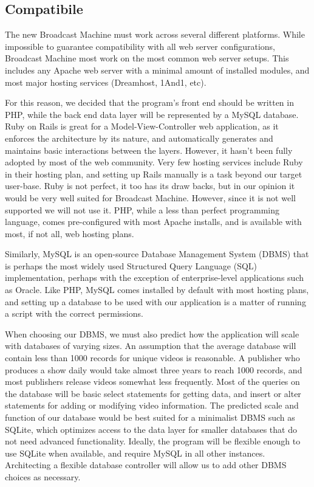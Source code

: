 \documentclass[a4paper,12pt]{report}
\begin{document}
\subsection{Compatibile}
The new Broadcast Machine must work across several different platforms. 
While impossible to guarantee compatibility with all web server configurations, Broadcast Machine most work on the most common web server setups. 
This includes any Apache web server with a minimal amount of installed modules, and most major hosting services (Dreamhost, 1And1, etc). 


For this reason, we decided that the program’s front end should be written in PHP, while the back end data layer will be represented by a MySQL database. 
Ruby on Rails is great for a Model-View-Controller web application, as it enforces the architecture by its nature, and automatically generates and maintains basic interactions between the layers. 
However, it hasn’t been fully adopted by most of the web community.  
Very few hosting services include Ruby in their hosting plan, and setting up Rails manually is a task beyond our target user-base. 
Ruby is not perfect, it too has its draw backs, but in our opinion it would be very well suited for Broadcast Machine. 
However, since it is not well supported we will not use it. 
PHP, while a less than perfect programming language, comes pre-configured with most Apache installs, and is available with most, if not all, web hosting plans. 


Similarly, MySQL is an open-source Database Management System (DBMS) that is perhaps the most widely used Structured Query Language (SQL) implementation, perhaps with the exception of enterprise-level applications such as Oracle. 
Like PHP, MySQL comes installed by default with most hosting plans, and setting up a database to be used with our application is a matter of running a script with the correct permissions. 


When choosing our DBMS, we must also predict how the application will scale with databases of varying sizes. 
An assumption that the average database will contain less than 1000 records for unique videos is reasonable. 
A publisher who produces a show daily would take almost three years to reach 1000 records, and most publishers release videos somewhat less frequently. 
Most of the queries on the database will be basic select statements for getting data, and insert or alter statements for adding or modifying video information. 
The predicted scale and function of our database would be best suited for a minimalist DBMS such as SQLite, which optimizes access to the data layer for smaller databases that do not need advanced functionality. 
Ideally, the program will be flexible enough to use SQLite when available, and require MySQL in all other instances. 
Architecting a flexible database controller will allow us to add other DBMS choices as necessary. 
\end{document}

